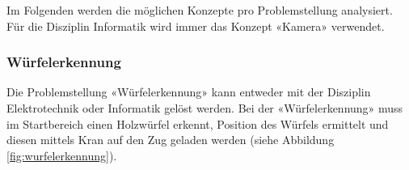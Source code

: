 \documentclass[../../main.tex]{subfiles}
\begin{document}
    Im Folgenden werden die möglichen Konzepte pro Problemstellung analysiert. Für die Disziplin Informatik
    wird immer das Konzept «Kamera» verwendet.

    \subsubsection{Würfelerkennung}
    Die Problemstellung «Würfelerkennung» kann entweder mit der Disziplin Elektrotechnik oder Informatik
    gelöst werden. Bei der «Würfelerkennung» muss im Startbereich einen Holzwürfel erkennt,
    Position des Würfels ermittelt und diesen mittels Kran auf den Zug geladen werden 
    (siehe Abbildung \ref{fig:wurfelerkennung}).
\end{document}
